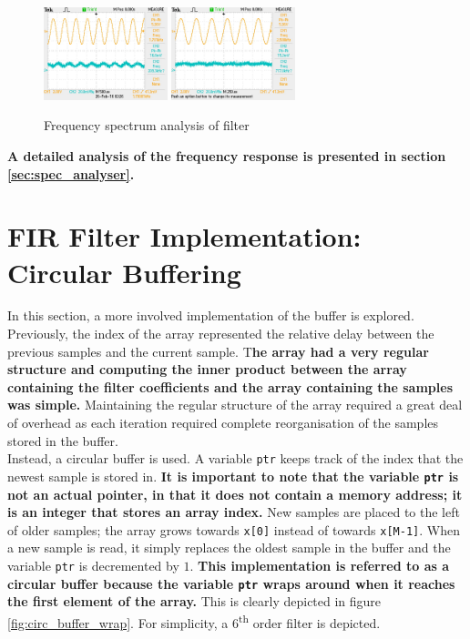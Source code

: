 \documentclass{article}
\begin{document}
\begin{figure}[H]
    \includegraphics[width=0.32\textwidth]{1700Hz}
    \includegraphics[width=0.32\textwidth]{2500Hz}
    \caption{Frequency spectrum analysis of filter}
    \label{fig:low_freq_test}
\end{figure}

\textbf{A detailed analysis of the frequency response is presented in section \ref{sec:spec_analyser}.}

\newpage
\section{FIR Filter Implementation: Circular Buffering}\label{sec:FIR_filter}
In this section, a more involved implementation of the buffer is explored. Previously, the index of the array represented the relative delay between the previous samples and the current sample. T\textbf{he array had a very regular structure and computing the inner product between the array containing the filter coefficients and the array containing the samples was simple.} Maintaining the regular structure of the array required a great deal of overhead as each iteration required complete reorganisation of the samples stored in the buffer.\\

Instead, a circular buffer is used. A variable {\tt ptr} keeps track of the index that the newest sample is stored in. \textbf{It is important to note that the variable {\tt ptr} is not an actual pointer, in that it does not contain a memory address; it is an integer that stores an array index.} New samples are placed to the left of older samples; the array grows towards {\tt x[0]} instead of towards {\tt x[M-1]}. When a new sample is read, it simply replaces the oldest sample in the buffer and the variable {\tt ptr} is decremented by $1$.\textbf{ This implementation is referred to as a circular buffer because the variable {\tt ptr} wraps around when it reaches the first element of the array.} This is clearly depicted in figure \ref{fig:circ_buffer_wrap}. For simplicity, a 6\textsuperscript{th} order filter is depicted.
\end{document}
